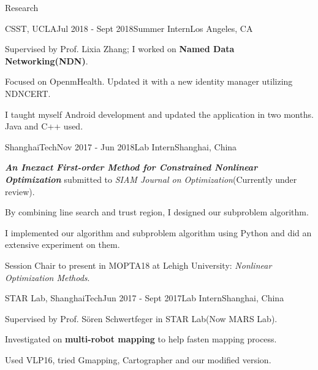 \documentclass{resume} %
\begin{document}
\begin{rSection}{Research}

\begin{rSubsection}
  {CSST, UCLA}{Jul 2018 - Sept 2018}{Summer Intern}{Los Angeles, CA}
    \item Supervised by Prof. Lixia Zhang; I worked on \textbf{Named Data Networking(NDN)}. 
    \item Focused on OpenmHealth. Updated it with a new identity manager utilizing NDNCERT.
    \item I taught myself Android development and updated the application in two months. Java and C++ used.
\end{rSubsection}


\begin{rSubsection}
  {ShanghaiTech}{Nov 2017 - Jun 2018}{Lab Intern}{Shanghai, China}
    \item \textbf{\textit{An Inexact First-order Method for Constrained Nonlinear Optimization}} submitted to \textit{SIAM Journal on Optimization}(Currently under review).
    \item By combining line search and trust region, I designed our subproblem algorithm.
    \item I implemented our algorithm and subproblem algorithm using Python and did an extensive experiment on them.
    \item Session Chair to present in MOPTA18 at Lehigh University: \textit{Nonlinear Optimization Methods}.
    
\end{rSubsection}


\begin{rSubsection}
  {STAR Lab, ShanghaiTech}{Jun 2017 - Sept 2017}{Lab Intern}{Shanghai, China}
    \item Supervised by Prof. Sören Schwertfeger in STAR Lab(Now MARS Lab).
    \item Investigated on \textbf{multi-robot mapping} to help fasten mapping process.
    \item Used VLP16, tried Gmapping, Cartographer and our modified version.
\end{rSubsection}

\end{rSection}
\end{document}
